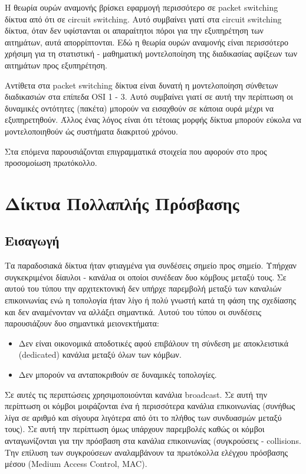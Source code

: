 \documentclass[12pt]{report}
\begin{document}
Η θεωρία ουρών αναμονής βρίσκει εφαρμογή περισσότερο σε \textlatin{packet switching} δίκτυα από ότι σε \textlatin{circuit switching}. Αυτό συμβαίνει γιατί στα \textlatin{circuit switching} δίκτυα, όταν δεν υφίστανται οι απαραίτητοι πόροι για την εξυπηρέτηση των αιτημάτων, αυτά απορρίπτονται. Εδώ η θεωρία ουρών αναμονής είναι περισσότερο χρήσιμη για τη στατιστική - μαθηματική μοντελοποίηση της διαδικασίας αφίξεων των αιτημάτων προς εξυπηρέτηση.

Αντίθετα στα \textlatin{packet switching} δίκτυα είναι δυνατή η μοντελοποίηση σύνθετων διαδικασιών στα επίπεδα \textlatin{OSI 1 - 3}. Αυτό συμβαίνει γιατί σε αυτή την περίπτωση οι δυναμικές οντότητες (πακέτα) μπορούν να εισαχθούν σε κάποια ουρά μέχρι να εξυπηρετηθούν. Άλλος ένας λόγος είναι ότι τέτοιας μορφής δίκτυα μπορούν εύκολα να μοντελοποιηθούν ώς συστήματα διακριτού χρόνου.

Στα επόμενα παρουσιάζονται επιγραμματικά στοιχεία που αφορούν στο προς προσομοίωση πρωτόκολλο.

\section{Δίκτυα Πολλαπλής Πρόσβασης}
\subsection{Εισαγωγή}
Τα παραδοσιακά δίκτυα ήταν φτιαγμένα για συνδέσεις σημείο προς σημείο. Υπήρχαν συγκεκριμένοι δίαυλοι - κανάλια οι οποίοι συνέδεαν δυο κόμβους μεταξύ τους. Σε αυτού του τύπου την αρχιτεκτονική δεν υπήρχε παρεμβολή μεταξύ των καναλιών επικοινωνίας ενώ η τοπολογία ήταν λίγο ή πολύ γνωστή κατά τη φάση της σχεδίασης και δεν αναμένονταν να αλλάξει σημαντικά. Αυτού του τύπου οι συνδέσεις παρουσιάζουν δυο σημαντικά μειονεκτήματα:

\begin{itemize}
  \item Δεν είναι οικονομικά αποδοτικές αφού επιβάλουν τη σύνδεση με αποκλειστικά (\textlatin{dedicated}) κανάλια μεταξύ όλων των κόμβων.
  \item Δεν μπορούν να ανταποκριθούν σε δυναμικές τοπολογίες.
\end{itemize}

Σε αυτές τις περιπτώσεις χρησιμοποιούνται κανάλια \textlatin{broadcast}. Σε αυτή την περίπτωση οι κόμβοι μοιράζονται ένα ή περισσότερα κανάλια επικοινωνίας (συνήθως λίγα σε αριθμό και σίγουρα λιγότερα από ότι το πλήθος των συνδυασμών μεταξύ τους). Σε αυτή την περίπτωση όμως υπάρχουν παρεμβολές καθώς οι κόμβοι ανταγωνίζονται για την πρόσβαση στα κανάλια επικοινωνίας (συγκρούσεις - \textlatin{collisions}. Την επίλυση των συγκρούσεων αναλαμβάνουν τα πρωτόκολλα ελέγχου πρόσβασης μέσου (\textlatin{Medium Access Control, MAC}).
\end{document}
